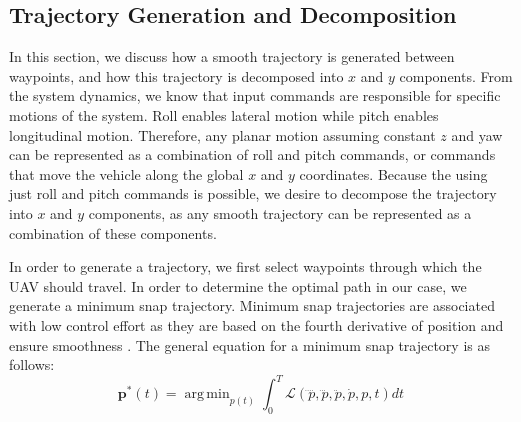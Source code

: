 \documentclass[letterpaper, 10 pt, conference]{ieeeconf}  %
\newcommand\NB[1]{$\spadesuit$\footnote{NB: #1}}
\DeclareMathOperator*{\argmin}{arg\,min}
\begin{document}
\subsection{Trajectory Generation and Decomposition} \label{sec:traj}

In this section, we discuss how a smooth trajectory is generated between waypoints, and how this trajectory is decomposed into $x$ and $y$ components. From the system dynamics, we know that input commands are responsible for specific motions of the system. Roll enables lateral motion while pitch enables longitudinal motion. Therefore, any planar motion assuming constant $z$ and yaw can be represented as a combination of roll and pitch commands, or commands that move the vehicle along the global $x$ and $y$ coordinates. Because the using just roll and pitch commands is possible, we desire to decompose the trajectory into $x$ and $y$ components, as any smooth trajectory can be represented as a combination of these components.


In order to generate a trajectory, we first select waypoints through which the UAV should travel. In order to determine the optimal path in our case, we generate a minimum snap trajectory. Minimum snap trajectories are associated with low control effort as they are based on the fourth derivative of position and ensure smoothness \cite{minsnap}. The general equation for a minimum snap trajectory is as follows:
\begin{equation} \label{eq:minjerkint}
    \mathbf{p}^*(t) = \argmin_{p(t)}\int_0^T\mathcal{L}(\ddddot{p},\dddot{p},\ddot{p},\dot{p},p,t)dt
\end{equation}
\end{document}
